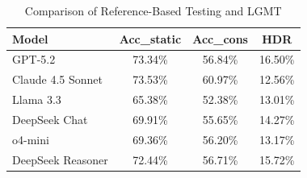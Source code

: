 \begin{table}[pos=htbp]
\centering
\caption{Comparison of Reference-Based Testing and LGMT}\label{tab:rq2}
\begin{tabular}{lccc}
\toprule
Model & Acc\_static & Acc\_cons & HDR \\
\midrule
GPT-5.2 & 73.34\% & 56.84\% & 16.50\% \\
Claude 4.5 Sonnet & 73.53\% & 60.97\% & 12.56\% \\
Llama 3.3 & 65.38\% & 52.38\% & 13.01\% \\
DeepSeek Chat & 69.91\% & 55.65\% & 14.27\% \\
o4-mini & 69.36\% & 56.20\% & 13.17\% \\
DeepSeek Reasoner & 72.44\% & 56.71\% & 15.72\% \\
\bottomrule
\end{tabular}
\end{table}